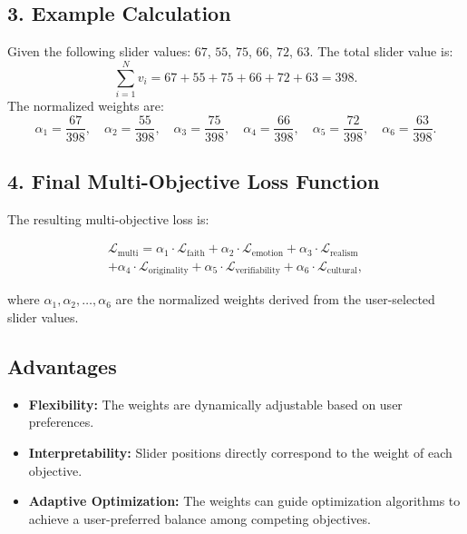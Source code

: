 \subsection*{3. Example Calculation}
Given the following slider values:  $67$, 
 $55$, 
 $75$, 
 $66$, 
 $72$, 
 $63$.
The total slider value is:
\[
\sum_{i=1}^N v_i = 67 + 55 + 75 + 66 + 72 + 63 = 398.
\]
The normalized weights are:
\[
\alpha_1 = \frac{67}{398}, \quad \alpha_2 = \frac{55}{398}, \quad \alpha_3 = \frac{75}{398}, \quad \alpha_4 = \frac{66}{398}, \quad \alpha_5 = \frac{72}{398}, \quad \alpha_6 = \frac{63}{398}.
\]

\subsection*{4. Final Multi-Objective Loss Function}
The resulting multi-objective loss is:

\begin{multline*}
\mathcal{L}_{\text{multi}} = \alpha_1 \cdot \mathcal{L}_{\text{faith}}
+ \alpha_2 \cdot \mathcal{L}_{\text{emotion}}
+ \alpha_3 \cdot \mathcal{L}_{\text{realism}} \\
+ \alpha_4 \cdot \mathcal{L}_{\text{originality}}
+ \alpha_5 \cdot \mathcal{L}_{\text{verifiability}}
+ \alpha_6 \cdot \mathcal{L}_{\text{cultural}},
\end{multline*}

where \(\alpha_1, \alpha_2, \ldots, \alpha_6\) are the normalized weights derived from the user-selected slider values.

\subsection*{Advantages}
\begin{itemize}[leftmargin=10pt, itemsep=0pt, topsep=3pt]
    \item \textbf{Flexibility:} The weights are dynamically adjustable based on user preferences.
    \item \textbf{Interpretability:} Slider positions directly correspond to the weight of each objective.
    \item \textbf{Adaptive Optimization:} The weights can guide optimization algorithms to achieve a user-preferred balance among competing objectives.
\end{itemize}



